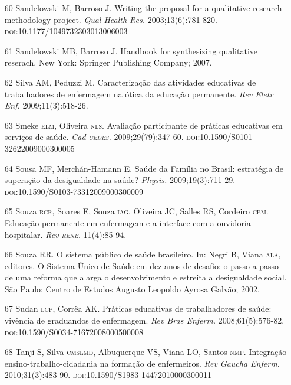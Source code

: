 \documentclass{article}
\begin{document}
\begin{itemize}
\item[60] Sandelowski M, Barroso J. Writing the proposal for a qualitative
research methodology project. \textit{Qual Health Res.}
2003;13(6):781-820. \textsc{doi}:10.1177/1049732303013006003

\item[61] Sandelowski MB, Barroso J. Handbook for synthesizing qualitative
reserach. New York: Springer Publishing Company; 2007.

\item[62] Silva AM, Peduzzi M. Caracterização das atividades educativas de
trabalhadores de enfermagem na ótica da educação permanente. \textit{Rev Eletr
Enf.}
2009;11(3):518-26.

\item[63] Smeke \textsc{elm}, Oliveira \textsc{nls}. Avaliação participante de práticas educativas
em serviços de saúde. \textit{Cad \textsc{cedes}.}
2009;29(79):347-60. \textsc{doi}:10.1590/S0101-32622009000300005

\item[64] Sousa MF, Merchán-Hamann E. Saúde da Família no Brasil: estratégia de
superação da desigualdade na saúde? \textit{Physis.}
2009;19(3):711-29. \textsc{doi}:10.1590/S0103-73312009000300009

\item[65] Souza \textsc{rcr}, Soares E, Souza \textsc{iag}, Oliveira JC, Salles RS, Cordeiro \textsc{cem}.
Educação permanente em enfermagem e a interface com a ouvidoria hospitalar.
\textit{Rev \textsc{rene}.}
11(4):85-94.

\item[66] Souza RR. O sistema público de saúde brasileiro. In: Negri B, Viana
\textsc{ala}, editores. O Sistema Único de Saúde em dez anos de desafio: o passo a passo
de uma reforma que alarga o desenvolvimento e estreita a desigualdade social.
São Paulo: Centro de Estudos Augusto Leopoldo Ayrosa Galvão; 2002.

\item[67] Sudan \textsc{lcp}, Corrêa AK. Práticas educativas de trabalhadores de saúde:
vivência de graduandos de enfermagem. \textit{Rev Bras Enferm.}
2008;61(5):576-82. \textsc{doi}:10.1590/S0034-71672008000500008

\item[68] Tanji S, Silva \textsc{cmslmd}, Albuquerque VS, Viana LO, Santos \textsc{nmp}.
Integração ensino-trabalho-cidadania na formação de enfermeiros. \textit{Rev
Gaucha Enferm.}
2010;31(3):483-90. \textsc{doi}:10.1590/S1983-14472010000300011


\end{itemize}
\end{document}
